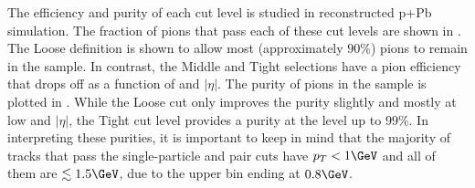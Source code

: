 The efficiency and purity of each cut level is studied in reconstructed p+Pb \Hijing simulation.
The fraction of pions that pass each of these cut levels are shown in .
The Loose definition is shown to allow most (approximately $90\%$) pions to remain in the sample.
In contrast, the Middle and Tight selections have a pion efficiency that drops off as a function of \pt and $|\eta|$.
The purity of pions in the sample is plotted in .
While the Loose cut only improves the purity slightly and mostly at low \pt and $|\eta|$, the Tight cut level provides a purity at the level up to $99\%$.
In interpreting these purities, it is important to keep in mind that the majority of tracks that pass the single-particle and pair cuts have $p_T < 1 \GeV$ and all of them are $\lesssim 1.5 \GeV$, due to the upper \kt bin ending at $0.8 \GeV$.

